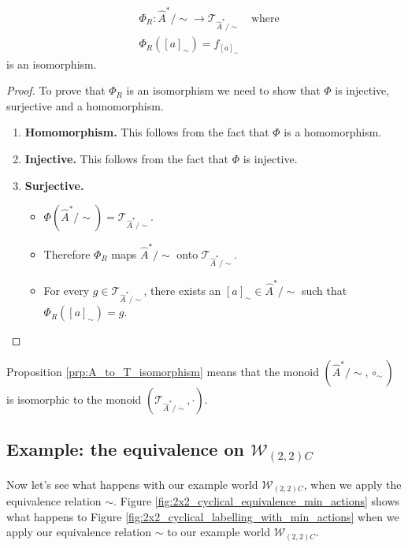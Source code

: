 \begin{proposition}\label{prp:A_to_T_isomorphism}
    \begin{equation}
    \begin{aligned}
        & \Phi_{R} : \hat{A}^{\ast}/\sim \to \mathcal{T}_{\hat{A}^{\ast}/\sim} \quad \text{where} \\
        & \Phi_{R}([a]_{\sim}) = f_{[a]_{\sim}}
    \end{aligned}
    \end{equation}
    is an isomorphism.
\end{proposition}
\begin{proof}
    To prove that $\Phi_{R}$ is an isomorphism we need to show that $\Phi$ is injective, surjective and a homomorphism.
    \begin{enumerate}[(1)]
        \item \textbf{Homomorphism.}
        This follows from the fact that $\Phi$ is a homomorphism.

        \item \textbf{Injective.}
        This follows from the fact that $\Phi$ is injective.

        \item \textbf{Surjective.}
        \begin{itemize}
            \item $\Phi(\hat{A}^{\ast}/\sim) = \mathcal{T}_{\hat{A}^{\ast}/\sim}$.
            \item Therefore $\Phi_{R}$ maps $\hat{A}^{\ast}/\sim$ onto $\mathcal{T}_{\hat{A}^{\ast}/\sim}$.
            \item For every $g \in \mathcal{T}_{\hat{A}^{\ast}/\sim}$, there exists an $[a]_{\sim} \in \hat{A}^{\ast}/\sim$ such that $\Phi_{R}([a]_{\sim}) = g$.
        \end{itemize}
    \end{enumerate}
\end{proof}

Proposition \ref{prp:A_to_T_isomorphism} means that the monoid $(\hat{A}^{\ast}/\sim, \circ_{\sim})$ is isomorphic to the monoid $(\mathcal{T}_{\hat{A}^{\ast}/\sim}, \cdot)$.


\subsection{Example: the equivalence on $\mathscr{W}_{(2,2)C}$}

Now let's see what happens with our example world $\mathscr{W}_{(2,2)C}$, when we apply the equivalence relation $\sim$.
Figure \ref{fig:2x2_cyclical_equivalence_min_actions} shows what happens to Figure \ref{fig:2x2_cyclical_labelling_with_min_actions} when we apply our equivalence relation $\sim$ to our example world $\mathscr{W}_{(2,2)C}$.

